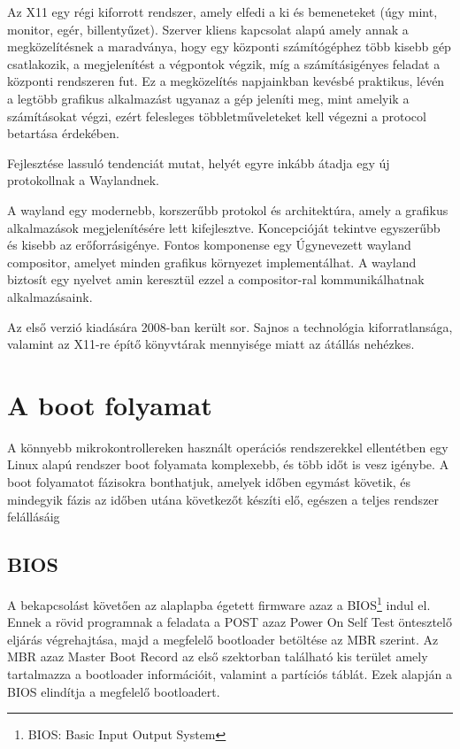 Az X11 egy régi kiforrott rendszer, amely elfedi a ki és bemeneteket (úgy mint,
monitor, egér, billentyűzet). Szerver kliens kapcsolat alapú amely annak a
megközelítésnek a maradványa, hogy egy központi számítógéphez több kisebb gép
csatlakozik, a megjelenítést a végpontok végzik, míg a számításigényes feladat a
központi rendszeren fut. Ez a megközelítés napjainkban kevésbé praktikus, lévén a
legtöbb grafikus alkalmazást ugyanaz a gép jeleníti meg, mint amelyik a
számításokat végzi, ezért felesleges többletműveleteket kell végezni a protocol
betartása érdekében.

Fejlesztése lassuló tendenciát mutat, helyét egyre inkább átadja egy új
protokollnak a Waylandnek.

\medskip

A wayland egy modernebb, korszerűbb protokol és architektúra, amely a grafikus
alkalmazások megjelenítésére lett kifejlesztve. Koncepcióját tekintve egyszerűbb
és kisebb az erőforrásigénye. Fontos komponense egy Úgynevezett wayland
compositor, amelyet minden grafikus környezet implementálhat. A wayland biztosít
egy nyelvet amin keresztül ezzel a compositor-ral kommunikálhatnak
alkalmazásaink.

Az első verzió kiadására 2008-ban került sor. Sajnos a technológia
kiforratlansága, valamint az X11-re építő könyvtárak mennyisége miatt az átállás
nehézkes.

\section{A boot folyamat}

A könnyebb mikrokontrollereken használt operációs rendszerekkel ellentétben egy
Linux alapú rendszer boot folyamata komplexebb, és több időt is vesz igénybe. A
boot folyamatot fázisokra bonthatjuk, amelyek időben egymást követik, és
mindegyik fázis az időben utána következőt készíti elő, egészen a teljes rendszer
felállásáig

\subsection{BIOS}

A bekapcsolást követően az alaplapba égetett firmware azaz a BIOS\footnote{BIOS:
Basic Input Output System} indul el. Ennek a rövid programnak a feladata a POST
azaz Power On Self Test öntesztelő eljárás végrehajtása, majd a megfelelő
bootloader betöltése az MBR szerint. Az MBR azaz Master Boot Record az első
szektorban található kis terület amely tartalmazza a bootloader információit,
valamint a partíciós táblát. Ezek alapján a BIOS elindítja a megfelelő
bootloadert.

